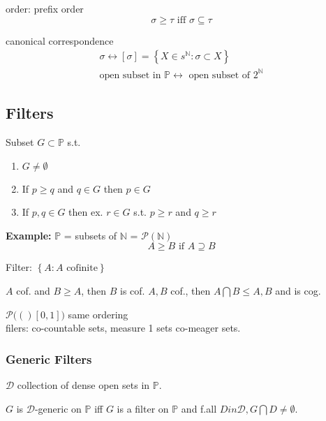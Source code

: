 \documentclass[12pt]{article}
\newcommand{\Nat}{\ensuremath{\mathbb{N}}}
\newcommand{\Pow}[1]{\ensuremath{\mathcal{P}(#1)}}
\begin{document}
order: prefix order
\[
 \sigma \ge \tau \text{ iff } \sigma \subseteq \tau
\]

canonical correspondence
\begin{align*}
  \sigma \leftrightarrow [\sigma] = \left\{X \in s^{\Nat} : \sigma \subset X \right\} \\
  \text{open subset in } \mathbb{P} \leftrightarrow \text{ open subset of } 2^{\Nat}
\end{align*}

\subsection*{Filters}
Subset $G \subset \mathbb{P}$ s.t.
\begin{enumerate}
  \item $G \ne \emptyset$
  \item If $p \ge q$ and $q \in G$ then $p \in G$
  \item If $p,q \in G$ then ex. $r \in G$ s.t. $p \ge r$ and $q \ge r$ 
\end{enumerate}

\textbf{Example:}
$\mathbb{P}$ = subsets of $\Nat$ = $\Pow{\Nat}$
\[
        A \ge B \text{ if } A \supseteq B
\]

Filter: $\left\{A : A \text{ cofinite} \right\}$

$A$ cof. and $B \ge A$, then $B$ is cof.
$A,B$ cof., then $A \bigcap B \le A,B$ and is cog.


$\Pow([0,1])$ same ordering \\
filers: co-countable sets,
measure 1 sets
co-meager sets.

\subsubsection*{Generic Filters}
$\mathcal{D}$ collection of dense open sets in $\mathbb{P}$.

$G$ is $\mathcal{D}$-generic on $\mathbb{P}$ iff 
$G$ is a filter on $\mathbb{P}$ and f.all $D in \mathcal{D}, G \bigcap D \ne \emptyset$. 
\end{document}
